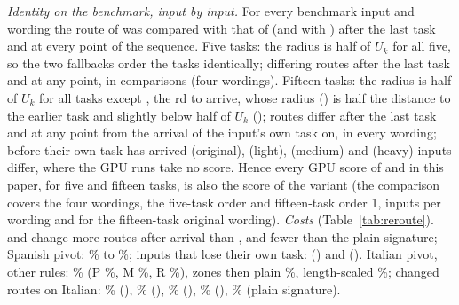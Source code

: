 \emph{Identity on the benchmark, input by input.} For every benchmark input and wording the route of \cert{} was compared with that of \certscaled{} (and \nearest{} with \scaled{}) after the last task and at every point of the sequence. Five tasks: the radius is half of $U_k$ for all five, so the two fallbacks order the tasks identically; \RerouteIdFiveLast{} differing routes after the last task and \RerouteIdFiveScored{} at any point, in \RerouteIdFiveComparisons{} comparisons (four wordings). Fifteen tasks: the radius is half of $U_k$ for all tasks except \texttt{\RerouteIdTask{}}, the \RerouteIdTaskPos{}rd to arrive, whose radius (\RerouteIdRadius{}) is half the distance to the earlier task \texttt{\RerouteIdEarlier{}} and slightly below half of $U_k$ (\RerouteIdHalfB{}); \RerouteIdFifteenLast{} routes differ after the last task and \RerouteIdFifteenScored{} at any point from the arrival of the input's own task on, in every wording; before their own task has arrived \RerouteIdFifteenBeforeOriginal{} (original), \RerouteIdFifteenBeforeLight{} (light), \RerouteIdFifteenBeforeMedium{} (medium) and \RerouteIdFifteenBeforeHeavy{} (heavy) inputs differ, where the GPU runs take no score. Hence every GPU score of \cert{} and \nearest{} in this paper, for five and fifteen tasks, is also the score of the variant (the comparison covers the four wordings, the five-task order and fifteen-task order 1, \RerouteBenchInputs{} inputs per wording and \RerouteIdFifteenOriginalN{} for the fifteen-task original wording).
\emph{Costs} (Table~\ref{tab:reroute}). \scaled{} and \certscaled{} change more routes after arrival than \cert{}, \nearest{} and fewer than the plain signature; Spanish pivot: \certscaled{} \RerouteCertFourEsChanged{}\% to \scaled{} \RerouteBgEsChanged{}\%; inputs that lose their own task: \RerouteBgNLost{} (\scaled{}) and \RerouteCertFourNLost{} (\certscaled{}). Italian pivot, other rules: \cert{} \RerouteCertItOwn{}\% (\textsf{P} \WidenRefTfiveItP{}\%, \textsf{M} \WidenRefTfiveItM{}\%, \textsf{R} \WidenRefTfiveItR{}\%), zones then plain \RerouteHybItOwn{}\%, length-scaled \RerouteNormItOwn{}\%; changed routes on Italian: \RerouteBgItChanged{}\% (\scaled{}), \RerouteCertFourItChanged{}\% (\certscaled{}), \RerouteCertItChanged{}\% (\cert{}), \RerouteNearItChanged{}\% (\nearest{}), \RerouteSigItChanged{}\% (plain signature).

\begin{table}[t]
  \caption{The stress test of Section~\ref{sec:stress} with the scaled fallbacks: a sixth task whose definition is the light (upper block) or the medium (lower block) rewording of the definition of task~2 arrives after the five tasks; old test inputs of task~2 (\RerouteStressOld{} per wording) routed elsewhere afterwards. Original and light inputs are certified under every rule with zones. In the lower block the medium wording is the look-alike's own wording, so its \RerouteStressOld{} are re-routed under every rule.}
  \label{tab:reroutestress}
  \centering
  \footnotesize
  
\end{table}

